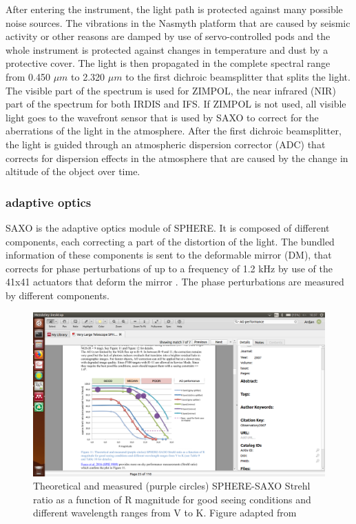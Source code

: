 \documentclass[twoside,single,12pt]{lion-msc}
\begin{document}
After entering the instrument, the light path is protected against many possible noise sources. The vibrations in the Nasmyth platform that are caused by seismic activity or other reasons are damped by use of servo-controlled pods and the whole instrument is protected against changes in temperature and dust by a protective cover. The light is then propagated in the complete spectral range from 0.450 $\mu m$ to 2.320 $\mu m$ to the first dichroic beamsplitter that splits the light. The visible part of the spectrum is used for ZIMPOL, the near infrared (NIR) part of the spectrum for both IRDIS and IFS. If ZIMPOL is not used, all visible light goes to the wavefront sensor that is used by SAXO to correct for the aberrations of the light in the atmosphere. After the first dichroic beamsplitter, the light is guided through an atmospheric dispersion corrector (ADC) that corrects for dispersion effects in the atmosphere that are caused by the change in altitude of the object over time.
\bigskip

\subsubsection{adaptive optics}
SAXO is the adaptive optics module of SPHERE. It is composed of different components, each correcting a part of the distortion of the light. The bundled information of these components is sent to the deformable mirror (DM), that corrects for phase perturbations of up to a frequency of 1.2 kHz by use of the 41x41 actuators that deform the mirror \citep{Hugot2012}. The phase perturbations are measured by different components.
\bigskip

\begin{figure}[htbp]
\centering
\includegraphics[trim={7cm 4.5cm 19cm 10cm},clip,width = 1\textwidth]{aoperformance}
\caption{Theoretical and measured (purple circles) SPHERE-SAXO Strehl ratio as a function of R magnitude for good seeing conditions and different wavelength ranges from V to K. Figure adapted from \citep{Fusco2014}}
\label{fig:aoperformance}
\end{figure}
\end{document}
